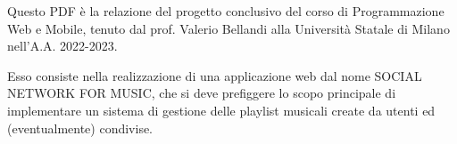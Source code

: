 Questo PDF è la relazione del progetto conclusivo del corso di Programmazione Web e Mobile, tenuto dal prof. Valerio Bellandi alla Università Statale di Milano nell'A.A. 2022-2023.

Esso consiste nella realizzazione di una applicazione web dal nome \uppercase{Social Network for Music}, che si deve prefiggere lo scopo principale di implementare un sistema di gestione delle playlist musicali create da utenti ed (eventualmente) condivise.